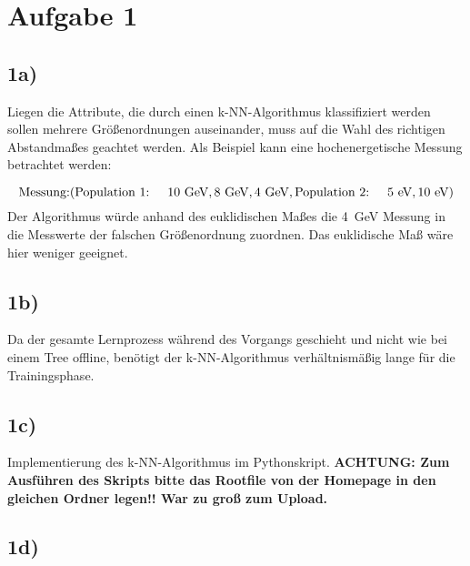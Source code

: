 \newpage\section*{Aufgabe 1}
\subsection*{1a)}
Liegen die Attribute, die durch einen k-NN-Algorithmus klassifiziert werden sollen mehrere Größenordnungen auseinander, muss auf die Wahl des richtigen Abstandmaßes geachtet werden. Als Beispiel kann eine hochenergetische Messung betrachtet werden:

\begin{equation*}
\text{Messung:}(\text{Population 1:}\hspace{0.5cm}10~\text{GeV},8~\text{GeV}, 4~\text{GeV},\text{Population 2:}\hspace{0.5cm} 5~\text{eV}, 10~\text{eV})
\end{equation*}
\noindent
Der Algorithmus würde anhand des euklidischen Maßes die 4~GeV Messung in die Messwerte der falschen Größenordnung zuordnen. Das euklidische Maß wäre hier weniger geeignet.

\subsection*{1b)}
Da der gesamte Lernprozess während des Vorgangs geschieht und nicht wie bei einem Tree offline, benötigt der k-NN-Algorithmus verhältnismäßig lange für die Trainingsphase.

\subsection*{1c)}
Implementierung des k-NN-Algorithmus im Pythonskript.
\textbf{ACHTUNG: Zum Ausführen des Skripts bitte das Rootfile von der Homepage in den gleichen Ordner legen!! War zu groß zum Upload.}
\subsection*{1d)}

